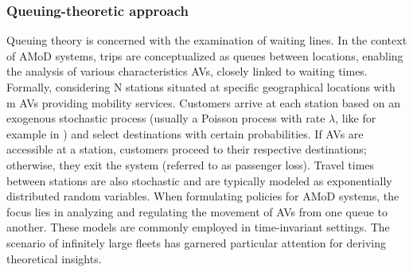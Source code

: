 \subsubsection*{Queuing-theoretic approach}
Queuing theory is concerned with the examination of waiting lines. In the context of AMoD systems, trips are conceptualized as queues between locations, enabling the analysis of various characteristics AVs, closely linked to waiting times. Formally, considering N stations situated at specific geographical locations with m AVs providing mobility services. Customers arrive at each station based on an exogenous stochastic process (usually a Poisson process with rate $\lambda$, like for example in \cite{queue_theory}) and select destinations with certain probabilities. If AVs are accessible at a station, customers proceed to their respective destinations; otherwise, they exit the system (referred to as passenger loss). Travel times between stations are also stochastic and are typically modeled as exponentially distributed random variables. When formulating policies for AMoD systems, the focus lies in analyzing and regulating the movement of AVs from one queue to another.
These models are commonly employed in time-invariant settings. The scenario of infinitely large fleets  has garnered particular attention for deriving theoretical insights.



